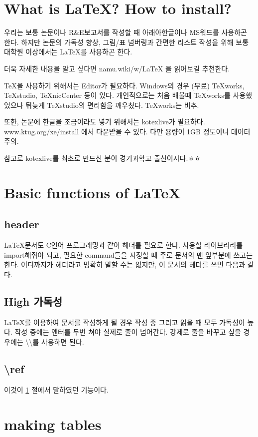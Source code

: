 \documentclass[11pt]{article}
\begin{document}
\section{What is \LaTeX ? How to install?}\label{intro}
우리는 보통 논문이나 R\&E보고서를 작성할 때 아래아한글이나 MS워드를 사용하곤 한다. 하지만 논문의 가독성 향상, 그림/표 넘버링과 간편한 리스트 작성을 위해 보통 대학원 이상에서는 \LaTeX 를 사용하곤 한다. 

더욱 자세한 내용을 알고 싶다면 namu.wiki/w/LaTeX 을 읽어보길 추천한다.

TeX을 사용하기 위해서는 Editor가 필요하다.
Windows의 경우 (무료) TeXworks, TeXstudio, TeXnicCenter 등이 있다. 개인적으로는 처음 배울때 TeXworks를 사용했었으나 뒤늦게 TeXstudio의 편리함을 깨우쳤다. TeXworks는 비추.

또한, 논문에 한글을 조금이라도 넣기 위해서는 kotexlive가 필요하다. www.ktug.org/xe/install 에서 다운받을 수 있다. 다만 용량이 1GB 정도이니 데이터 주의.

참고로 kotexlive를 최초로 만드신 분이 경기과학고 출신이시다.ㅎㅎ 

\section{Basic functions of \LaTeX}
\subsection{header}
\LaTeX 문서도 C언어 프로그래밍과 같이 헤더를 필요로 한다. 사용할 라이브러리를 import해줘야 되고, 필요한 command들을 지정할 때 주로 문서의 맨 앞부분에 쓰고는 한다. 어디까지가 헤더라고 명확히 말할 수는 없지만, 이 문서의 헤더를 쓰면 다음과 같다.

\subsection{High 가독성}
\LaTeX 를 이용하여 문서를 작성하게 될 경우 작성 중 그리고 읽을 때 모두 가독성이 높다.
작성 중에는 엔터를 두번 쳐야 실제로 줄이 넘어간다. 강제로 줄을 바꾸고 싶을 경우에는 \textbackslash \textbackslash 를 사용하면 된다.

\subsection{\textbackslash ref}

이것이 \ref{intro} 절에서 말하였던 기능이다.

\section{making tables}
\end{document}

